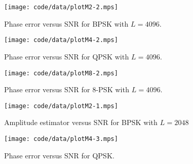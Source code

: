 \documentclass[journal]{IEEEtran}
\begin{document}
\begin{figure}[p]
	\centering
		\texttt{[image: code/data/plotM2-2.mps]}
		\caption{Phase error versus SNR for BPSK with $L=4096$.}
		\label{fig:plotphaseBPSK}
\end{figure}

\begin{figure}[p]
	\centering
		\texttt{[image: code/data/plotM4-2.mps]}
		\caption{Phase error versus SNR for QPSK with $L=4096$.}
		\label{fig:plotphaseQPSK}
\end{figure}

\begin{figure}[p]
	\centering
		\texttt{[image: code/data/plotM8-2.mps]}
		\caption{Phase error versus SNR for $8$-PSK with $L=4096$.}
		\label{fig:plotphase8PSK}
\end{figure}



\begin{figure}[tp]
	\centering
		\texttt{[image: code/data/plotM2-1.mps]}
		\caption{Amplitude estimator versus SNR for BPSK with $L=2048$}
		\label{fig:plotampBPSK}
\end{figure}




\begin{figure}[tp]
	\centering
		\texttt{[image: code/data/plotM4-3.mps]}
		\caption{Phase error versus SNR for QPSK.}
		\label{fig:plotphaseQPSKmultL}
\end{figure}

\end{document}
